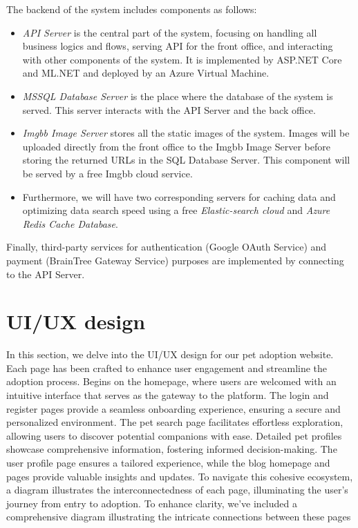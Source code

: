 The backend of the system includes components as follows:
\begin{itemize}
    \item \textit{API Server} is the central part of the system, focusing on 
    handling all business logics and flows, serving API for the front office, 
    and interacting with other components of the system. It is implemented by ASP.NET Core and ML.NET and deployed by an Azure Virtual Machine.
    \item \textit{MSSQL Database Server} is the place where the database of the system is served. 
    This server interacts with the API Server and the back office.
    \item \textit{Imgbb Image Server} stores all the static images of the system. Images will 
    be uploaded directly from the front office to the Imgbb Image Server before storing the returned URLs in the SQL Database Server. This component will 
    be served by a free Imgbb cloud service.
    \item Furthermore, we will have two corresponding servers for caching data and optimizing 
    data search speed using a free \textit{Elastic-search cloud} and \textit{Azure Redis Cache Database}.
\end{itemize}

Finally, third-party services for authentication (Google OAuth Service) and payment (BrainTree Gateway Service) purposes are implemented by connecting to the API Server.

\section{UI/UX design}

In this section, we delve into the UI/UX design for our pet adoption website. Each page has been crafted to enhance user engagement and streamline the adoption process. Begins on the homepage, where users are welcomed with an intuitive interface that serves as the gateway to the platform. The login and register pages provide a seamless onboarding experience, ensuring a secure and personalized environment. The pet search page facilitates effortless exploration, allowing users to discover potential companions with ease. Detailed pet profiles showcase comprehensive information, fostering informed decision-making. The user profile page ensures a tailored experience, while the blog homepage and pages provide valuable insights and updates. To navigate this cohesive ecosystem, a diagram illustrates the interconnectedness of each page, illuminating the user's journey from entry to adoption. To enhance clarity, we've included a comprehensive diagram illustrating the intricate connections between these pages
